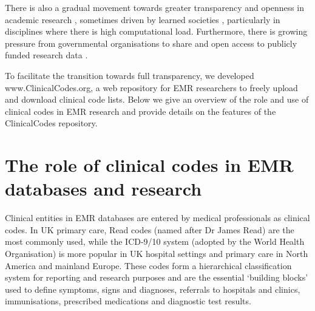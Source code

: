 \documentclass[10pt]{article}
\begin{document}
There is also a gradual movement towards greater transparency and openness in academic research \cite{Bechhofer2013, Stodden2013, Pampel2013}, sometimes driven by learned societies \cite{RoyalSoc2012}, particularly in disciplines where there is high computational load. Furthermore, there is growing pressure from governmental organisations to share and open access to publicly funded research data \cite{EuropeanCommission2012, OfficeSciTech2013}.

To facilitate the transition towards full transparency, we developed www.ClinicalCodes.org, a web repository for EMR researchers to freely upload and download clinical code lists.  Below we give an overview of the role and use of clinical codes in EMR research and provide details on the features of the ClinicalCodes repository.


\section*{The role of clinical codes in EMR databases and research}


Clinical entities in EMR databases are entered by medical professionals as clinical codes.  In UK primary care, Read codes (named after Dr James Read) are the most commonly used, while the ICD-9/10 system (adopted by the World Health Organisation)  is more popular in UK hospital settings and primary care in North America and mainland Europe.  These codes form a hierarchical classification system for reporting and research purposes and are the essential `building blocks' used to define symptoms, signs and diagnoses, referrals to hospitals and clinics, immunisations, prescribed medications and diagnostic test results.
\end{document}
